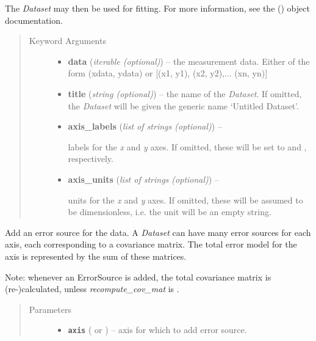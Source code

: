 \documentclass[a4paper,10pt,english]{sphinxmanual}
\begin{document}
\begin{fulllineitems}
The \emph{Dataset} may then be used for fitting. For more information, see the
{\hyperref[index:kafe.fit.Fit]{\emph{}}} () object documentation.
\begin{quote}\begin{description}
\item[{Keyword Arguments}] \leavevmode\begin{itemize}
\item {} 
\textbf{data} (\emph{iterable (optional)}) --
the measurement data. Either of the form (xdata, ydata) or
{[}(x1, y1), (x2, y2),... (xn, yn){]}

\item {} 
\textbf{title} (\emph{string (optional)}) --
the name of the \emph{Dataset}. If omitted, the \emph{Dataset} will be given the
generic name `Untitled Dataset'.

\item {} 
\textbf{axis\_labels} (\emph{list of strings (optional)}) --

labels for the \emph{x} and \emph{y} axes. If omitted, these will be set to
 and , respectively.

\item {} 
\textbf{axis\_units} (\emph{list of strings (optional)}) --

units for the \emph{x} and \emph{y} axes. If omitted, these will be assumed to be
dimensionless, i.e. the unit will be an empty string.

\end{itemize}

\end{description}\end{quote}

\begin{fulllineitems}
\label{index:kafe.dataset.Dataset.add_error_source}
Add an error source for the data. A \emph{Dataset} can have many
error sources for each axis, each corresponding to a covariance matrix.
The total error model for the axis is represented by the sum of
these matrices.

Note: whenever an ErrorSource is added, the total covariance matrix
is (re-)calculated, unless \emph{recompute\_cov\_mat} is .
\begin{quote}\begin{description}
\item[{Parameters}] \leavevmode\begin{itemize}
\item {} 
\textbf{\texttt{axis}} ( or ) -- axis for which to add error source.


\end{itemize}
\end{description}
\end{quote}
\end{fulllineitems}
\end{fulllineitems}
\end{document}
